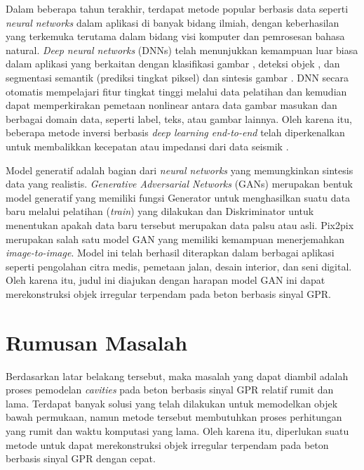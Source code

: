 Dalam beberapa tahun terakhir, terdapat metode popular berbasis data seperti \emph{neural networks} dalam aplikasi di banyak bidang ilmiah, dengan keberhasilan yang terkemuka terutama dalam bidang visi komputer dan pemrosesan bahasa natural. 
\emph{Deep neural networks} (DNNs) telah menunjukkan kemampuan luar biasa dalam aplikasi yang berkaitan dengan klasifikasi gambar \parencite{objectDetection}, deteksi objek \parencite{fasterRCNN}, dan segmentasi semantik (prediksi tingkat piksel) \parencite{difNet} dan sintesis gambar \parencite{GAN}. 
DNN secara otomatis mempelajari fitur tingkat tinggi melalui data pelatihan dan kemudian dapat memperkirakan pemetaan nonlinear antara data gambar masukan dan berbagai domain data, seperti label, teks, atau gambar lainnya. 
Oleh karena itu, beberapa metode inversi berbasis \emph{deep learning end-to-end} telah diperkenalkan untuk membalikkan kecepatan atau impedansi dari data seismik \parencite{gprInvNet}.

Model generatif adalah bagian dari \emph{neural networks} yang memungkinkan sintesis data yang realistis. 
\emph{Generative Adversarial Networks} (GANs) merupakan bentuk model generatif yang memiliki fungsi Generator untuk menghasilkan suatu data baru melalui pelatihan (\emph{train}) yang dilakukan dan Diskriminator untuk menentukan apakah data baru tersebut merupakan data palsu atau asli. 
Pix2pix merupakan salah satu model GAN yang memiliki kemampuan menerjemahkan \emph{image-to-image}. 
Model ini telah berhasil diterapkan dalam berbagai aplikasi seperti pengolahan citra medis, pemetaan jalan, desain interior, dan seni digital. 
Oleh karena itu, judul ini diajukan dengan harapan model GAN ini dapat merekonstruksi objek irregular terpendam pada beton berbasis sinyal GPR.

\section{Rumusan Masalah}
\label{sec:rumusanmasalah}

Berdasarkan latar belakang tersebut, maka masalah yang dapat diambil adalah proses pemodelan \emph{cavities} pada beton berbasis sinyal GPR relatif rumit dan lama. 
Terdapat banyak solusi yang telah dilakukan untuk memodelkan objek bawah permukaan, namun metode tersebut membutuhkan proses perhitungan yang rumit dan waktu komputasi yang lama. 
Oleh karena itu, diperlukan suatu metode untuk dapat merekonstruksi objek irregular terpendam pada beton berbasis sinyal GPR dengan cepat.

